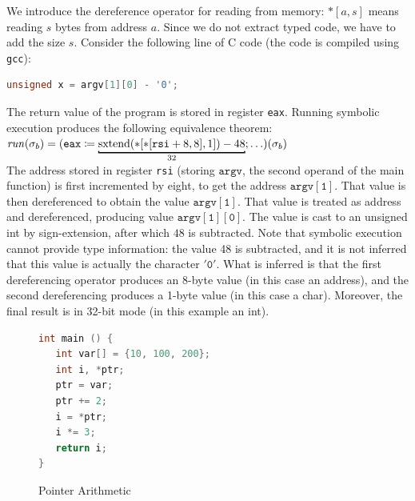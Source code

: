 We introduce the dereference operator for reading from memory: $\ast[a, s]$ means reading $s$ bytes from address $a$.
Since we do not extract typed code, we have to add the size $s$.
Consider the following line of C code (the code is compiled using \texttt{gcc}):
\begin{lstlisting}[language=C,style=customc]
unsigned x = argv[1][0] - '0';
\end{lstlisting}
The return value of the program is stored in register \texttt{eax}.
Running symbolic execution produces the following equivalence theorem:
\\[1em]
	\mbox{\hspace{0.5ex}} $\var{run}(\sigma_b) = (\mathtt{eax} \coloneqq \bitmoded{32}{\sextend(\ast[\ast[\mathtt{rsi} + 8, 8], 1]) - 48} ; \ldots)(\sigma_b)$
\\[1em]
The address stored in register \texttt{rsi} (storing $\mathtt{argv}$, the second operand of the main function) is first incremented by eight, to get the address $\mathtt{argv[1]}$. 
That value is then dereferenced to obtain the value $\mathtt{argv[1]}$.
That value is treated as address and dereferenced, producing value $\mathtt{argv[1][0]}$.
The value is cast to an unsigned int by sign-extension, after which $48$ is subtracted.
Note that symbolic execution cannot provide type information: the value 48 is subtracted, and it is not inferred that this value is actually the character $\mathtt{'0'}$.
What is inferred is that the first dereferencing operator produces an 8-byte value (in this case an address), and the second dereferencing produces a 1-byte value (in this case a char).
Moreover, the final result is in 32-bit mode (in this example an int).

\begin{figure}[thb]
\centering
\begin{lstlisting}[language=C,style=customc]
int main () {
   int var[] = {10, 100, 200};
   int i, *ptr;
   ptr = var;
   ptr += 2;
   i = *ptr;
   i *= 3;
   return i;
}
\end{lstlisting}
		\caption{Pointer Arithmetic}
		\label{fig:pointer2}
\end{figure}



